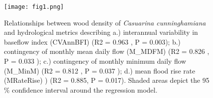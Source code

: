 \documentclass[openright,12pt,a4paper]{memoir}
\begin{document}
\clearpage


\begin{figure}[ht]
\begin{center}
\texttt{[image: fig1.png]} %
\caption[Relationships between wood density of \textit{Casuarina cunninghamiana} and hydrological metrics]{\small{Relationships between wood density of \textit{Casuarina cunninghamiana} and hydrological metrics describing a.) interannual variability in baseflow index (CVAnnBFI) (R2 = 0.963 , P = 0.003); b.) contingency of monthly mean daily flow (M_MDFM) (R2 = 0.826 , P = 0.033 ); c.) contingency of monthly minimum daily flow (M_MinM) (R2 = 0.812 , P = 0.037 );  d.) mean flood rise rate (MRateRise) ) (R2 = 0.885, P = 0.017). Shaded areas depict the 95 \% confidence interval around the regression model.}}
\label{Ch2sup_F1} %
\end{center}
\end{figure}   
\clearpage
\end{document}
